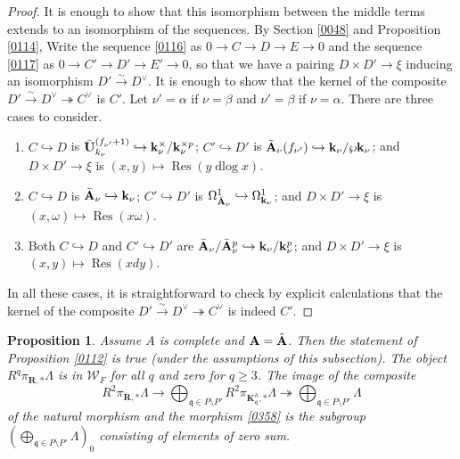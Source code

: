 \documentclass{amsart}
\newtheorem{Prop}[Thm]{Proposition}
\theoremstyle{remark}
\numberwithin{equation}{subsection}
\newcommand{\into}{\hookrightarrow}
\newcommand{\onto}{\twoheadrightarrow}
\newcommand{\isomto}{\overset{\sim}{\to}}
\newcommand{\alg}[1]{\mathbf{#1}}
\newcommand{\ideal}[1]{\mathfrak{#1}}
\DeclareMathOperator{\Res}{Res}
\DeclareMathOperator{\dlog}{dlog}
\begin{document}
\begin{proof}
	It is enough to show that this isomorphism between the middle terms extends
	to an isomorphism of the sequences.
	By Section \ref{0048}
	and Proposition \ref{0114},
	Write the sequence \eqref{0116}
	as $0 \to C \to D \to E \to 0$ and
	the sequence \eqref{0117}
	as $0 \to C' \to D' \to E' \to 0$,
	so that we have a pairing $D \times D' \to \xi$ inducing an isomorphism
	$D' \isomto D^{\vee}$.
	It is enough to show that
	the kernel of the composite $D' \isomto D^{\vee} \onto C^{\vee}$ is $C'$.
	Let $\nu' = \alpha$ if $\nu = \beta$ and $\nu' = \beta$ if $\nu = \alpha$.
	There are three cases to consider.
	\begin{enumerate}
		\item \label{0291}
			$C \into D$ is
			$\Tilde{\alg{U}}_{k_{\nu}}^{(f_{\nu'} + 1)} \into \alg{k}_{\nu}^{\times} / \alg{k}_{\nu}^{\times p}$;
			$C' \into D'$ is
			$\Tilde{\alg{A}}_{\nu}(f_{\nu'}) \into \alg{k}_{\nu} / \wp \alg{k}_{\nu}$;
			and $D \times D' \to \xi$ is $(x, y) \mapsto \Res(y \dlog x)$.
		\item \label{0292}
			$C \into D$ is
			$\Bar{\alg{A}}_{\nu} \into \alg{k}_{\nu}$;
			$C' \into D'$ is
			$\Omega_{\Bar{\alg{A}}_{\nu}}^{1} \into \Omega_{\alg{k}_{\nu}}^{1}$;
			and $D \times D' \to \xi$ is $(x, \omega) \mapsto \Res(x \omega)$.
		\item \label{0293}
			Both $C \into D$ and $C' \into D'$ are
			$\Bar{\alg{A}}_{\nu} / \Bar{\alg{A}}_{\nu}^{p} \into \alg{k}_{\nu} / \alg{k}_{\nu}^{p}$;
			and $D \times D' \to \xi$ is $(x, y) \mapsto \Res(x dy)$.
	\end{enumerate}
	In all these cases, it is straightforward to check by explicit calculations that
	the kernel of the composite $D' \isomto D^{\vee} \onto C^{\vee}$ is indeed $C'$.
\end{proof}

\begin{Prop} \label{0294}
	Assume $A$ is complete and $\alg{A} = \Hat{\alg{A}}$.
	Then the statement of Proposition \ref{0112} is true
	(under the assumptions of this subsection).
	The object $R^{q} \pi_{\alg{R}, \ast} \Lambda$ is in $\mathcal{W}_{F}$ for all $q$
	and zero for $q \ge 3$.
	The image of the composite
		\[
				R^{2} \pi_{\alg{R}, \ast} \Lambda
			\to
				\bigoplus_{\ideal{q} \in P \setminus P'}
					R^{2} \pi_{\alg{K}_{\ideal{q}}^{h}, \ast} \Lambda
			\onto
				\bigoplus_{\ideal{q} \in P \setminus P'}
					\Lambda
		\]
	of the natural morphism and the morphism \eqref{0358} is
	the subgroup $(\bigoplus_{\ideal{q} \in P \setminus P'} \Lambda)_{0}$ consisting of elements of zero sum.
\end{Prop}
\end{document}
